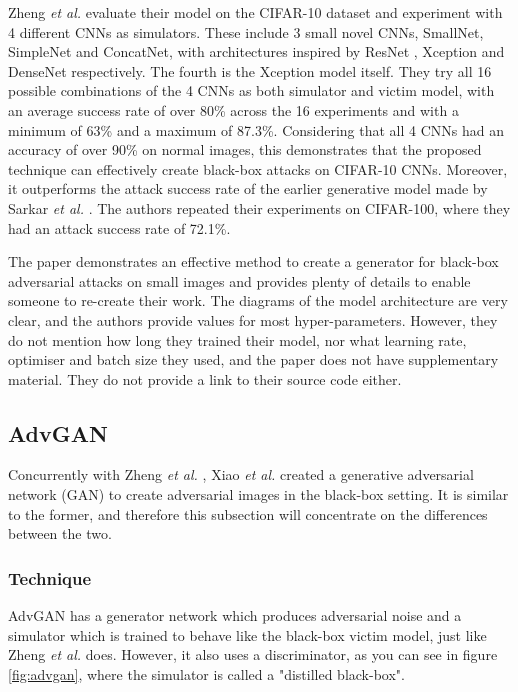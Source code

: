 Zheng \textit{et al.} \cite{zheng_black_box_GAN} evaluate their model on the CIFAR-10 dataset and experiment with 4 different CNNs as simulators. These include 3 small novel CNNs, SmallNet, SimpleNet and ConcatNet, with architectures inspired by ResNet \cite{resnet}, Xception \cite{xception} and DenseNet \cite{densenet} respectively. The fourth is the Xception model \cite{xception} itself. They try all 16 possible combinations of the 4 CNNs as both simulator and victim model, with an average success rate of over 80\% across the 16 experiments and with a minimum of 63\% and a maximum of 87.3\%. Considering that all 4 CNNs had an accuracy of over 90\% on normal images, this demonstrates that the proposed technique can effectively create black-box attacks on CIFAR-10 CNNs. Moreover, it outperforms the attack success rate of the earlier generative model made by Sarkar \textit{et al.} \cite{upset_angri}. The authors repeated their experiments on CIFAR-100, where they had an attack success rate of 72.1\%.

The paper demonstrates an effective method to create a generator for black-box adversarial attacks on small images and provides plenty of details to enable someone to re-create their work. The diagrams of the model architecture are very clear, and the authors provide values for most hyper-parameters. However, they do not mention how long they trained their model, nor what learning rate, optimiser and batch size they used, and the paper does not have supplementary material. They do not provide a link to their source code either.

\subsection{AdvGAN}
    \label{subsec:AdvGAN}
    
Concurrently with Zheng \textit{et al.} \cite{zheng_black_box_GAN}, Xiao \textit{et al.} \cite{advGAN} created a generative adversarial network (GAN) \cite{gans} to create adversarial images in the black-box setting. It is similar to the former, and therefore this subsection will concentrate on the differences between the two.

\subsubsection{Technique}

AdvGAN has a generator network which produces adversarial noise and a simulator which is trained to behave like the black-box victim model, just like Zheng \textit{et al.} does. However, it also uses a discriminator, as you can see in figure \ref{fig:advgan}, where the simulator is called a "distilled black-box". 

